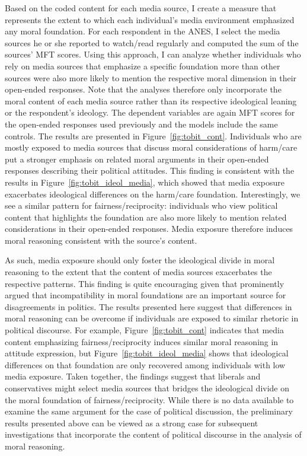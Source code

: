 \documentclass[12pt]{article}
\begin{document}
Based on the coded content for each media source, I create a measure that represents the extent to which each individual's media environment emphasized any moral foundation. For each respondent in the ANES, I select the media sources he or she reported to watch/read regularly and computed the sum of the sources' MFT scores. Using this approach, I can analyze whether individuals who rely on media sources that emphasize a specific foundation more than other sources were also more likely to mention the respective moral dimension in their open-ended responses. Note that the analyses therefore only incorporate the moral content of each media source rather than its respective ideological leaning or the respondent's ideology.  The dependent variables are again MFT scores for the open-ended responses used previously and the models include the same controls. The results are presented in Figure~\ref{fig:tobit_cont}. Individuals who are mostly exposed to media sources that discuss moral considerations of harm/care put a stronger emphasis on related moral arguments in their open-ended responses describing their political attitudes. This finding is consistent with the results in Figure~\ref{fig:tobit_ideol_media}, which showed that media exposure exacerbates ideological differences on the harm/care foundation. Interestingly, we see a similar pattern for fairness/reciprocity: individuals who view political content that highlights the foundation are also more likely to mention related considerations in their open-ended responses. Media exposure therefore induces moral reasoning consistent with the source's content.

As such, media exposure should only foster the ideological divide in moral reasoning to the extent that the content of media sources exacerbates the respective patterns. This finding is quite encouraging given that \citet{haidt2012righteous} prominently argued that incompatibility in moral foundations are an important source for disagreements in politics. The results presented here suggest that differences in moral reasoning can be overcome if individuals are exposed to similar rhetoric in political discourse. For example, Figure~\ref{fig:tobit_cont} indicates that media content emphasizing fairness/reciprocity induces similar moral reasoning in attitude expression, but Figure~\ref{fig:tobit_ideol_media} shows that ideological differences on that foundation are only recovered among individuals with low media exposure. Taken together, the findings suggest that liberals and conservatives might select media sources that bridges the ideological divide on the moral foundation of fairness/reciprocity. While there is no data available to examine the same argument for the case of political discussion, the preliminary results presented above can be viewed as a strong case for subsequent investigations that incorporate the content of political discourse in the analysis of moral reasoning.
\end{document}
